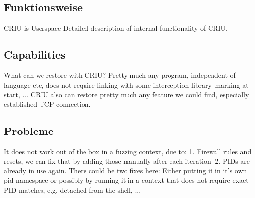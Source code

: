 \documentclass[a4paper]{article}
\begin{document}
\subsection{Funktionsweise}
CRIU is Userspace 
Detailed description of internal functionality of CRIU.
\subsection{Capabilities}
What can we restore with CRIU? Pretty much any program, independent of language etc, does not require linking with some interception library, marking at start, ... CRIU also can restore pretty much any feature we could find, especially established TCP connection.
\subsection{Probleme}
It does not work out of the box in a fuzzing context, due to: 1. Firewall rules and resets, we can fix that by adding those manually after each iteration. 2. PIDs are already in use again. There could be two fixes here: Either putting it in it's own pid namespace or possibly by running it in a context that does not require exact PID matches, e.g. detached from the shell, ...
\end{document}
